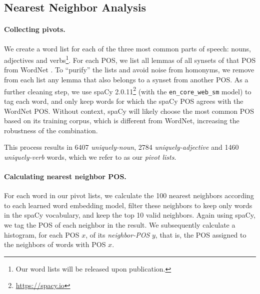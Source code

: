 \documentclass[11pt,a4paper]{article}
\begin{document}
    \subsection{Nearest Neighbor Analysis}\label{sec:nn_exp}
        
    \paragraph{Collecting pivots.}
    
    We create a word list for each of the three most
    common parts of speech:
    nouns, adjectives and verbs\footnote{Our word lists will be released upon publication.}.
    For each POS, we list all lemmas of all synsets of that POS from
    WordNet \cite{miller1998wordnet}.
    To ``purify'' the lists and avoid noise from homonyms,
    we remove from each list any lemma that also belongs to a synset from
    another POS.
    As a further cleaning step, we use
    spaCy 2.0.11\footnote{\url{https://spacy.io}} (with the \texttt{en\_core\_web\_sm} model)
    to tag each word,
    and only keep words for which the spaCy POS agrees with the WordNet POS.
    Without context, spaCy will likely choose the most
    common POS based on its training corpus, which is different from WordNet,
    increasing the robustness of the combination.
    
    This process results in 6407 \textit{uniquely-noun}, 2784 \textit{uniquely-adjective}
    and 1460 \textit{uniquely-verb} words, which we refer to as our \textit{pivot lists}.
    
    \paragraph{Calculating nearest neighbor POS.}
    
    For each word in our pivot lists, we calculate the 100 nearest neighbors
    according to each learned word embedding model, filter these neighbors to
    keep only words in the spaCy vocabulary, and keep the top 10 valid neighbors.
    Again using spaCy, we tag the POS of each neighbor in the result.
    We subsequently calculate a histogram, for each POS $x$, of its
    \textit{neighbor-POS} $y$, that is, the POS assigned to the neighbors of
    words with POS $x$.
    
\end{document}
